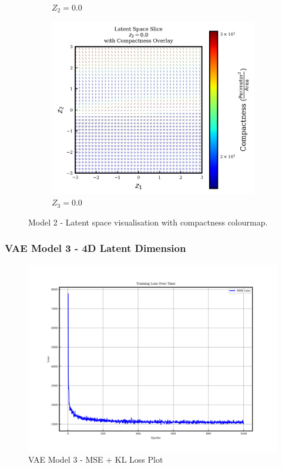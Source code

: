 \documentclass{article}
\begin{document}
\begin{figure}[H]
\begin{subfigure}{0.8\textwidth}
    \caption{$Z_2=0.0$}
    \label{fig:model2_fixz2_latent}
  \end{subfigure}
  \par\medskip
  \begin{subfigure}{0.8\textwidth}
  \centering
    \includegraphics[height=0.3\textheight]{figures/VAEmodels/model2/fix_z3_0.0.png}
    \caption{$Z_3 = 0.0$}
    \label{fig:model2_fixz3_latent}
  \end{subfigure}
  \caption{Model 2 - Latent space visualisation with compactness colourmap.}
  \label{fig:three-plots-vert}
\end{figure}

\subsubsection{VAE Model 3 - 4D Latent Dimension}

\begin{figure}[H]
\centering
    \includegraphics[width=0.75\linewidth]{figures/VAEmodels/model3/loss_plot.png}
    \caption{VAE Model 3 - MSE + KL Loss Plot}
    \label{fig:model3_loss_plot}
\end{figure}
\end{document}
